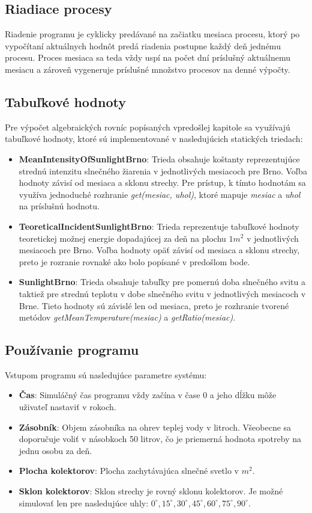 \documentclass[a4paper, 11pt]{article}
\begin{document}
\subsection{Riadiace procesy}\label{solar_energy_proces}
Riadenie programu je cyklicky predávané na začiatku mesiaca procesu, ktorý po vypočítaní aktuálnych hodnôt predá riadenia postupne každý deň jednému procesu. Proces mesiaca sa teda vždy uspí na počet dní príslušný aktuálnemu mesiacu a zároveň vygeneruje príslušné množstvo procesov na denné výpočty.

\subsection{Tabuľkové hodnoty}
Pre výpočet algebraických rovníc popísaných vpredošlej kapitole sa využívajú tabuľkové hodnoty, ktoré sú implementované v nasledujúcich statických triedach:
\begin{itemize}
	\item \textbf{MeanIntensityOfSunlightBrno}: Trieda obsahuje koštanty reprezentujúce strednú intenzitu slnečného žiarenia v jednotlivých mesiacoch pre Brno. Voľba hodnoty závisí od mesiaca a sklonu strechy. Pre prístup, k tímto hodnotám sa využíva jednoduché rozhranie \textit{get(mesiac, uhol)}, ktoré mapuje \textit{mesiac} a \textit{uhol} na príslušnú hodnotu.
	\item \textbf{TeoreticalIncidentSunlightBrno}: Trieda reprezentuje tabuľkové hodnoty teoretickej možnej energie dopadajúcej za deň na plochu $1m^{2}$ v jednotlivých mesiacoch pre Brno. Voľba hodnoty opäť závisí od mesiaca a sklonu strechy, preto je rozranie rovnaké ako bolo popísané v predošlom bode.
	\item \textbf{SunlightBrno}: Trieda obsahuje tabuľky pre pomernú doba slnečného svitu a taktiež pre strednú teplotu v dobe slnečného svitu v jednotlivých mesiacoch v Brne. Tieto hodnoty sú závislé len od mesiaca, preto je rozhranie tvorené metódov \textit{getMeanTemperature(mesiac)} a \textit{getRatio(mesiac)}.
\end{itemize}

\subsection{Používanie programu}
Vstupom programu sú nasledujúce parametre systému:
\begin{itemize}
	\item \textbf{Čas}: Simuláčný čas programu vždy začína v čase 0 a jeho dĺžku môže uživateľ nastaviť v rokoch.
	\item \textbf{Zásobník}: Objem zásobníka na ohrev teplej vody v litroch. Všeobecne sa doporučuje voliť v násobkoch 50 litrov, čo je priemerná hodnota spotreby na jednu osobu za deň.
	\item \textbf{Plocha kolektorov}: Plocha zachytávajúca slnečné svetlo v $m^2$.
	\item \textbf{Sklon kolektorov}: Sklon strechy je rovný sklonu kolektorov. Je možné simulovať len pre nasledujúce uhly: $0^{\circ}, 15^{\circ}, 30^{\circ}, 45^{\circ}, 60^{\circ}, 75^{\circ}, 90^{\circ}$.
\end{itemize}
\end{document}
